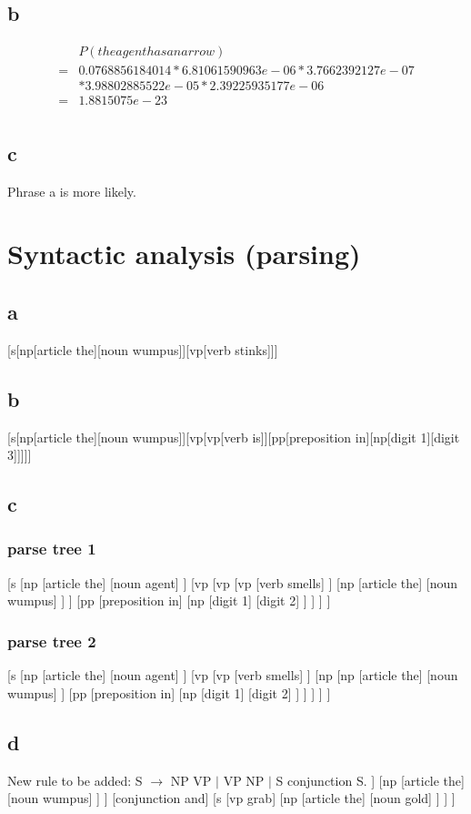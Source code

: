 \documentclass[12pt]{article}
\begin{document}
\subsection{b}
\begin{align*}
  &P(the agent has an arrow)\\
  =& 0.0768856184014*6.81061590963e-06*3.7662392127e-07\\
  &*3.98802885522e-05*2.39225935177e-06\\
  =& 1.8815075e-23\\
\end{align*}
\subsection{c}
Phrase a is more likely.

\section{Syntactic analysis (parsing)}
\subsection{a}
           [s[np[article the][noun wumpus]][vp[verb stinks]]]
\subsection{b}
           [s[np[article the][noun wumpus]][vp[vp[verb is]][pp[preposition in][np[digit 1][digit 3]]]]]
\subsection{c}
\subsubsection{parse tree 1}
              [s [np [article the] [noun agent] ] [vp [vp [vp [verb smells] ] [np [article the] [noun wumpus] ] ] [pp [preposition in] [np [digit 1] [digit 2] ] ] ] ]
\subsubsection{parse tree 2}
              [s [np [article the] [noun agent] ] [vp [vp [verb smells] ] [np [np [article the] [noun wumpus] ] [pp [preposition in] [np [digit 1] [digit 2] ] ] ] ] ]
\subsection{d}
New rule to be added: S $\to$ NP VP $|$ VP NP $|$ S conjunction S. \newline
[s [s [vp [verb shoot] ] [np [article the] [noun wumpus] ] ] [conjunction and] [s [vp grab] [np [article the] [noun gold] ] ] ]
\end{document}
